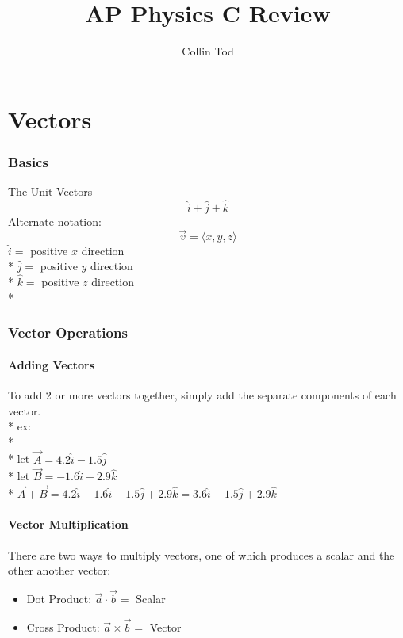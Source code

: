 \documentclass[a4paper,12pt]{article}
\title{AP Physics C Review}
\author{Collin Tod}
\begin{document}
	\maketitle
	\newpage
	\tableofcontents
	\newpage

	\part{Vectors}
		\section{Basics}
			The Unit Vectors
			\begin{equation*}
				\hat{i} + \hat{j} + \hat{k}
			\end{equation*}
			\noindent	
			Alternate notation:
			\begin{equation*}
					\vec{v} = \langle x,y,z\rangle
			\end{equation*}
			\noindent
			$\hat{i} =$ positive $x$ direction \\*
			$\hat{j} =$ positive $y$ direction \\*
			$\hat{k} =$ positive $z$ direction \\*
		\section{Vector Operations}
			\subsection{Adding Vectors}
				To add 2 or more vectors together, simply add the separate components of each vector. \\*
				ex:\\*\\*
					\indent let $\vec{A} = 4.2\hat{i} -1.5\hat{j}$\\* 
					\indent let $\vec{B} = -1.6\hat{i} +2.9\hat{k}$\\*
					\indent $\vec{A} + \vec{B} = 4.2\hat{i} - 1.6\hat{i} -1.5\hat{j} + 2.9\hat{k} = 3.6\hat{i} -1.5\hat{j} + 2.9\hat{k}$
			\subsection{Vector Multiplication}
				There are two ways to multiply vectors, one of which produces a scalar and the other another vector:
				\begin{itemize}
						\item Dot Product: $\vec{a} \cdot \vec{b} =$ Scalar
						\item Cross Product: $\vec{a} \times \vec{b}=$ Vector
				\end{itemize}
				
\end{document}

